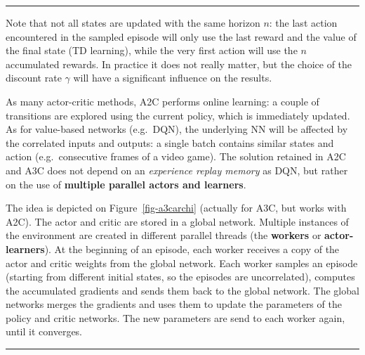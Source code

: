 \documentclass[
  letterpaper,
  DIV=11,
  numbers=noendperiod]{scrreprt}
\begin{document}
\begin{center}\rule{0.5\linewidth}{0.5pt}\end{center}

Note that not all states are updated with the same horizon \(n\): the
last action encountered in the sampled episode will only use the last
reward and the value of the final state (TD learning), while the very
first action will use the \(n\) accumulated rewards. In practice it does
not really matter, but the choice of the discount rate \(\gamma\) will
have a significant influence on the results.

As many actor-critic methods, A2C performs online learning: a couple of
transitions are explored using the current policy, which is immediately
updated. As for value-based networks (e.g.~DQN), the underlying NN will
be affected by the correlated inputs and outputs: a single batch
contains similar states and action (e.g.~consecutive frames of a video
game). The solution retained in A2C and A3C does not depend on an
\emph{experience replay memory} as DQN, but rather on the use of
\textbf{multiple parallel actors and learners}.

The idea is depicted on Figure~\ref{fig-a3carchi} (actually for A3C, but
works with A2C). The actor and critic are stored in a global network.
Multiple instances of the environment are created in different parallel
threads (the \textbf{workers} or \textbf{actor-learners}). At the
beginning of an episode, each worker receives a copy of the actor and
critic weights from the global network. Each worker samples an episode
(starting from different initial states, so the episodes are
uncorrelated), computes the accumulated gradients and sends them back to
the global network. The global networks merges the gradients and uses
them to update the parameters of the policy and critic networks. The new
parameters are send to each worker again, until it converges.

\begin{center}\rule{0.5\linewidth}{0.5pt}\end{center}
\end{document}
